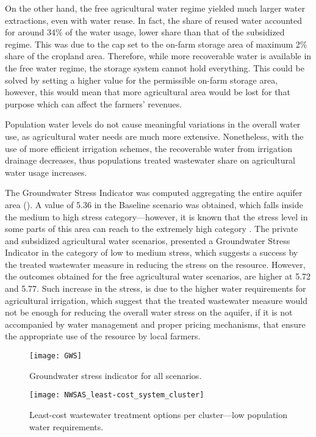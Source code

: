On the other hand, the free agricultural water regime yielded much larger water extractions, even with water reuse. In fact, the share of reused water accounted for around 34\% of the water usage, lower share than that of the subsidized regime. This was due to the cap set to the on-farm storage area of maximum 2\% share of the cropland area. Therefore, while more recoverable water is available in the free water regime, the storage system cannot hold everything. This could be solved by setting a higher value for the permissible on-farm storage area, however, this would mean that more agricultural area would be lost for that purpose which can affect the farmers' revenues.

Population water levels do not cause meaningful variations in the overall water use, as agricultural water needs are much more extensive. Nonetheless, with the use of more efficient irrigation schemes, the recoverable water from irrigation drainage decreases, thus populations treated wastewater share on agricultural water usage increases.

The Groundwater Stress Indicator was computed aggregating the entire aquifer area (). A value of 5.36 in the Baseline scenario was obtained, which falls inside the medium to high stress category---however, it is known that the stress level in some parts of this area can reach to the extremely high category \cite{herbertGlobalAssessmentCurrent2019}. The private and subsidized agricultural water scenarios, presented a Groundwater Stress Indicator in the category of low to medium stress, which suggests a success by the treated wastewater measure in reducing the stress on the resource. However, the outcomes obtained for the free agricultural water scenarios, are higher at 5.72 and 5.77. Such increase in the stress, is due to the higher water requirements for agricultural irrigation, which suggest that the treated wastewater measure would not be enough for reducing the overall water stress on the aquifer, if it is not accompanied by water management and proper pricing mechanisms, that ensure the appropriate use of the resource by local farmers.

\begin{figure}[!ht]
	\centering
	\texttt{[image: GWS]}
	\caption{Groundwater stress indicator for all scenarios.}
	\label{fig:gws}
\end{figure}

\begin{figure}[!ht]
	\centering
	\texttt{[image: NWSAS\_least-cost\_system\_cluster]}
	\caption{Least-cost wastewater treatment options per cluster---low population water requirements.}
	\label{fig:leastLow}
\end{figure}

